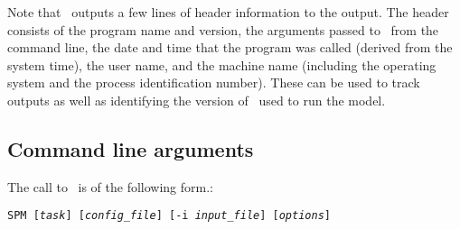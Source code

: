 Note that \SPM\ outputs a few lines of header information to the output. The header consists of the program name and version, the arguments passed to \SPM\ from the command line, the date and time that the program was called (derived from the system time), the user name, and the machine name (including the operating system and the process identification number). These can be used to track outputs as well as identifying the version of \SPM\ used to run the model.

\subsection{Command line arguments\label{sec:command-line-arguments}}

The call to \SPM\ is of the following form.: 

\texttt{SPM [\emph{task}] [\emph{config\_file}] [-i \emph{input\_file}] [\emph{options}]}


